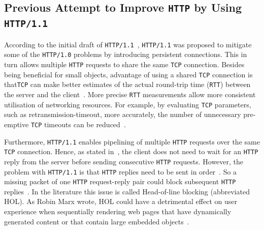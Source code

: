 \documentclass[12pt,a4paper,twoside,openright]{report}
\begin{document}
\subsection{Previous Attempt to Improve \texttt{HTTP} by Using \texttt{HTTP/1.1}}

According to the initial draft of \texttt{HTTP/1.1}~\cite{RFC2068}, \texttt{HTTP/1.1} was proposed to mitigate some of the \texttt{HTTP/1.0} problems by introducing persistent connections.
This in turn allows multiple \texttt{HTTP} requests to share the same \texttt{TCP} connection.
Besides being beneficial for small objects, advantage of using a shared \texttt{TCP} connection is that\texttt{TCP} can make better estimates of the actual round-trip time (\texttt{RTT}) between the server and the client~\cite{bib_Computer_Networking_L6}.
More precise \texttt{RTT} measurements allow more consistent utilisation of networking resources.
For example, by evaluating \texttt{TCP} parameters, such as retransmission-timeout, more accurately, the number of unnecessary pre-emptive \texttt{TCP} timeouts can be reduced~\cite{bib_rtt_tcp_Retransmissions}.

Furthermore, \texttt{HTTP/1.1} enables pipelining of multiple \texttt{HTTP} requests over the same \texttt{TCP} connection.
Hence, as stated in~\cite{bib_digital_ocean_http11_vs_http2}, the client does not need to wait for an \texttt{HTTP} reply from the server before sending consecutive \texttt{HTTP} requests.
However, the problem with \texttt{HTTP/1.1} is that \texttt{HTTP} replies need to be sent in order~\cite{RFC7540}. 
So a missing packet of one \texttt{HTTP} request-reply pair could block subsequent \texttt{HTTP} replies~\cite{bib_digital_ocean_http11_vs_http2, head-of-line-blocking-in-quic-and-http-3-the-details}.
In the literature this issue is called Head-of-line blocking (abbreviated HOL).
As Robin Marx wrote, HOL could have a detrimental effect on user experience when sequentially rendering web pages that have dynamically generated content or that contain large embedded objects~\cite{head-of-line-blocking-in-quic-and-http-3-the-details}.
\end{document}
